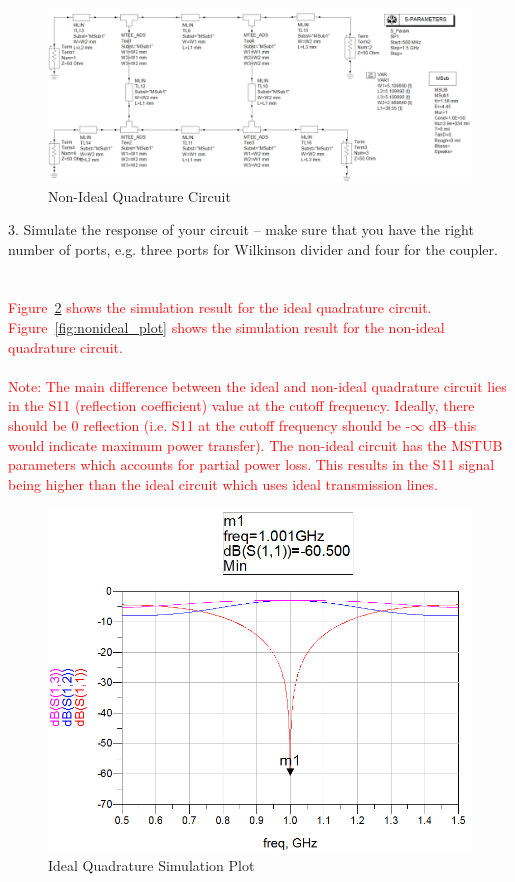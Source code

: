 \documentclass[conference]{IEEEtran}
\begin{document}
\begin{figure}[!htb]
\centering
\includegraphics[scale=0.2]{quadrature-nonideal-circuit.png}
\caption{Non-Ideal Quadrature Circuit}
\label{fig:nonideal_circuit}
\end{figure}

3. Simulate the response of your circuit – make sure that you have the right number of ports, e.g. three ports for Wilkinson divider and four for the coupler.\\\\\\
\textcolor{red}{Figure~\ref{fig:ideal_plot} shows the simulation result for the ideal quadrature circuit.  Figure~\ref{fig:nonideal_plot} shows the simulation result for the non-ideal quadrature circuit.\\\\
Note: The main difference between the ideal and non-ideal quadrature circuit lies in the S11 (reflection coefficient) value at the cutoff frequency.  Ideally, there should be 0 reflection (i.e. S11 at the cutoff frequency should be -$\infty$ dB--this would indicate maximum power transfer).  The non-ideal circuit has the MSTUB parameters which accounts for partial power loss.  This results in the S11 signal being higher than the ideal circuit which uses ideal transmission lines.}\\

\begin{figure}[!h]
\centering
\includegraphics[scale=0.35]{quadrature-ideal-plot.png}
\caption{Ideal Quadrature Simulation Plot}
\label{fig:ideal_plot}
\end{figure}
\end{document}
